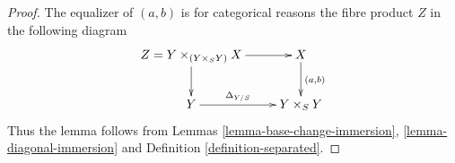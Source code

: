 \documentclass{stacks-project}
\theoremstyle{plain}
\theoremstyle{definition}
\theoremstyle{remark}
\numberwithin{equation}{subsection}
\begin{document}
\begin{proof}
The equalizer of $(a, b)$ is for categorical reasons
the fibre product $Z$ in the following diagram
$$
\xymatrix{
Z = Y \times_{(Y \times_S Y)} X \ar[r] \ar[d] &
 X \ar[d]^{(a , b)} \\
Y \ar[r]^-{\Delta_{Y/S}} & Y \times_S Y
}
$$
Thus the lemma follows from Lemmas
\ref{lemma-base-change-immersion}, \ref{lemma-diagonal-immersion} and
Definition \ref{definition-separated}.
\end{proof}
\end{document}
